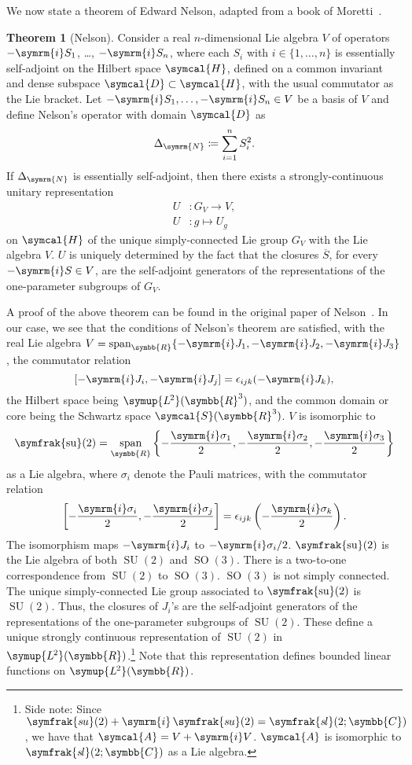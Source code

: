 \documentclass[12pt, a4 paper]{article}
\theoremstyle{definition}
\newtheorem{thm}{Theorem}
\newcommand{\ltwo}{\symup{L\kern-0.5pt^2}}
\newcommand{\ltworthree}{\ltwo(\rr^3)}
\newcommand{\rr}{\symbb{R}}
\newcommand{\cc}{\symbb{C}}
\newcommand{\hilbert}{\symcal{H}}
\newcommand{\ltwor}{\ltwo(\rr)}
\newcommand{\schwartz}{\symcal{S}}
\newcommand{\schwartzrthree}{\schwartz(\rr^3)}
\renewcommand{\i}{\symrm{i}}
\newcommand{\domain}{\symcal{D}}
\DeclareMathOperator{\spann}{span}
\newcommand{\sutwo}{\operatorname{\symfrak{su}}(2)}
\newcommand{\SUtwo}{\operatorname{SU}(2)}
\newcommand{\SOthree}{\operatorname{SO}(3)}
\begin{document}
    We now state a theorem of Edward Nelson, adapted from a book of Moretti~\cite[p.~291]{MorettiFundamental}.
    \begin{thm}[Nelson]
        Consider a real \(n\)-dimensional Lie algebra \(V\) of operators \(-\i S_1\), \ldots, \(-\i S_n\), where each \(S_i\) with \(i \in \{1, \ldots, n\}\) is essentially self-adjoint on the Hilbert space \(\hilbert\), defined on a common invariant and dense subspace \(\domain \subset \hilbert\), with the usual commutator as the Lie bracket.
        Let \(-\i S_1, \ldots, -\i S_n \in V\) be a basis of \(V\) and define Nelson's operator with domain \(\domain\) as
        \[
            \Delta_{\symrm{N}} \coloneq \sum_{i=1}^{n} S_i^2.
        \]
        If \(\Delta_{\symrm{N}}\) is essentially self-adjoint, then there exists a strongly-continuous unitary representation
        \begin{align*}
            U &\colon G_V \rightarrow V,\\
            U &\colon g \mapsto U_g
        \end{align*}
        on \(\hilbert\) of the unique simply-connected Lie group \(G_V\) with the Lie algebra \(V\).
        \(U\) is uniquely determined by the fact that the closures \(\overline{S}\), for every \(-\i S \in V\), are the self-adjoint generators of the representations of the one-parameter subgroups of \(G_V\).
    \end{thm}
    A proof of the above theorem can be found in the original paper of Nelson~\cite{Nelson}. In our case, we see that the conditions of Nelson's theorem are satisfied, with the real Lie algebra \(V = \spann_{\rr}\{-\i J_1, -\i J_2, -\i J_3\}\), the commutator relation \[[-\i J_i, -\i J_j] = \epsilon_{ijk}(-\i J_k),\] the Hilbert space being \(\ltworthree\), and the common domain or core  being the Schwartz space \(\schwartzrthree\). \(V\) is isomorphic to \[\displaystyle\sutwo = \spann_{\rr}\left\{-\frac{\i\sigma_1}{2}, -\frac{\i\sigma_2}{2}, -\frac{\i\sigma_3}{2}\right\}\] as a Lie algebra, where \(\sigma_i\) denote the Pauli matrices, with the commutator relation \[\displaystyle\left[-\frac{\i\sigma_i}{2}, -\frac{\i\sigma_j}{2}\right] = \epsilon_{ijk}\left(-\frac{\i\sigma_k}{2}\right).\] The isomorphism maps \(-\i J_i\) to \(-\i \sigma_i/2\). \(\sutwo\) is the Lie algebra of both \(\SUtwo\) and \(\SOthree\). There is a two-to-one correspondence from \(\SUtwo\) to \(\SOthree\). \(\SOthree\) is not simply connected. The unique simply-connected Lie group associated to \(\sutwo\) is \(\SUtwo\). Thus, the closures of \(J_i\)'s are the self-adjoint generators of the representations of the one-parameter subgroups of \(\SUtwo\). These define a unique strongly continuous representation of \(\SUtwo\) in \(\ltwor\).\footnote{Side note: Since \(\symfrak{s\kern-0.6ptu}(2) + \i\,\symfrak{s\kern-0.6ptu}(2) = \symfrak{s\kern-0.8ptl}(2;\cc)\), we have that \(\symcal{A} = V + \i V\). \(\symcal{A}\) is isomorphic to \(\symfrak{s\kern-0.8ptl}(2;\cc)\) as a Lie algebra.} Note that this representation defines bounded linear functions on \(\ltwor\).
\end{document}
